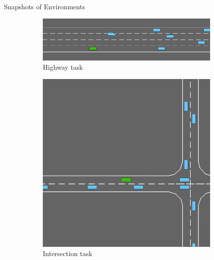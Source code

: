 \documentclass{beamer}
\begin{document}
\begin{frame}{Snapshots of Environments}
  \centering
  
\begin{figure}[t]
    \centering
    \begin{subfigure}{0.315\textwidth}
        \centering
        \includegraphics[width=\textwidth]{figs/highway.png}
        \caption{Highway task}
        \label{Fig_highway}
    \end{subfigure}
    \hfill
    \begin{subfigure}{0.315\textwidth}
        \centering
        \includegraphics[width=\textwidth]{figs/intersection.png}
        \caption{Intersection task}
        \label{Fig_intersect}
    \end{subfigure}
    \hfill
    \begin{subfigure}{0.315\textwidth}
        \centering

\end{subfigure}
\end{figure}
\end{frame}
\end{document}
